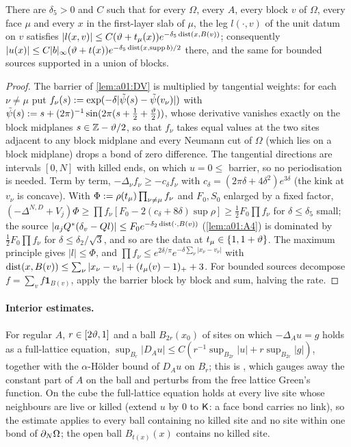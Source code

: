 \begin{lemma}\label{lem:a01:DVloc}
There are $\delta_5>0$ and $C$ such that for every $\Omega$, every $A$, every block $v$ of $\Omega$, every face $\mu$ and every $x$ in the first-layer slab of $\mu$, the leg $l(\cdot,v)$ of the unit datum on $v$ satisfies $|l(x,v)|\le C(\vartheta+t_\mu(x))e^{-\delta_5\operatorname{dist}(x,B(v))}$; consequently $|u(x)|\le C|b|_\infty(\vartheta+t(x))e^{-\delta_5\operatorname{dist}(x,\operatorname{supp} b)/2}$ there, and the same for bounded sources supported in a union of blocks.
\end{lemma}
\begin{proof}
The barrier of \cref{lem:a01:DV} is multiplied by tangential weights: for each $\nu\ne\mu$ put $f_\nu(s):=\exp(-\delta|\tilde\psi(s)-\tilde\psi(v_\nu)|)$ with $\tilde\psi(s):= s+(2\pi)^{-1}\sin(2\pi(s+\frac12+\frac{\vartheta}2))$, whose derivative vanishes exactly on the block midplanes $s\in\mathbb Z-\vartheta/2$, so that $f_\nu$ takes equal values at the two sites adjacent to any block midplane and every Neumann cut of $\Omega$ (which lies on a block midplane) drops a bond of zero difference. The tangential directions are intervals $[0,N]$ with killed ends, on which $u=0\le$ barrier, so no periodisation is needed. Term by term, $-\Delta_\nu f_\nu\ge-c_\delta f_\nu$ with $c_\delta=(2\pi\delta+4\delta^2)e^{3\delta}$ (the kink at $v_\nu$ is concave). With $\Phi:=\rho(t_\mu)\prod_{\nu\ne\mu}f_\nu$ and $F_0,S_0$ enlarged by a fixed factor, $(-\Delta^{N,D}+V_j)\Phi\ge\prod f_\nu[F_0-2(c_\delta+8\delta)\sup\rho]\ge\frac12F_0\prod f_\nu$ for $\delta\le\delta_5$ small; the source $|a_jQ^*(\delta_v-Ql)|\le F_0e^{-\delta_2\operatorname{dist}(\cdot,B(v))}$ (\cref{lem:a01:A4}) is dominated by $\frac12F_0\prod f_\nu$ for $\delta\le\delta_2/\sqrt3$, and so are the data at $t_\mu\in\{1,1+\vartheta\}$. The maximum principle gives $|l|\le\Phi$, and $\prod f_\nu\le e^{2\delta/\pi}e^{-\delta\sum_\nu|x_\nu-v_\nu|}$ with $\operatorname{dist}(x,B(v))\le\sum_\nu|x_\nu-v_\nu|+(t_\mu(v)-1)_++3$. For bounded sources decompose $f=\sum_vf\mathbf 1_{B(v)}$, apply the barrier block by block and sum, halving the rate.
\end{proof}

\paragraph{Interior estimates.} For regular $A$, $r\in[2\vartheta,1]$ and a ball $B_{2r}(x_0)$ of sites on which $-\Delta_Au=g$ holds as a full-lattice equation, $\sup_{B_r}|D_Au|\le C(r^{-1}\sup_{B_{2r}}|u|+r\sup_{B_{2r}}|g|)$, together with the $\alpha$-H\"older bound of $D_Au$ on $B_r$; this is \cite[(2.31)--(2.33)]{Ba4}, which gauges away the constant part of $A$ on the ball and perturbs from the free lattice Green's function. On the cube the full-lattice equation holds at every live site whose neighbours are live or killed (extend $u$ by $0$ to $\mathsf K$: a face bond carries no link), so the estimate applies to every ball containing no killed site and no site within one bond of $\partial_{N}\Omega$; the open ball $B_{t(x)}(x)$ contains no killed site.

